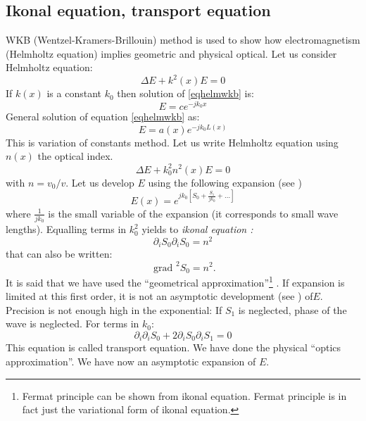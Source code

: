 \documentclass[12pt]{book}
\begin{document}
\subsection{Ikonal equation, transport equation}\label{secWKB}
WKB (Wentzel-Kramers-Brillouin) method
is used to show how electromagnetism (Helmholtz equation) implies geometric
and physical optical.
Let us consider Helmholtz equation:
\begin{equation}\label{eqhelmwkb}
\Delta E+k^2(x)E=0
\end{equation}
If $k(x)$ is a constant $k_0$ then solution of \ref{eqhelmwkb} is:
\begin{equation}
E=ce^{-jk_0x}
\end{equation}
General solution of equation \ref{eqhelmwkb} as:
\begin{equation}
E=a(x)e^{-jk_0L(x)}
\end{equation}
This is variation of constants method. Let us write Helmholtz
equation  using $n(x)$ the optical 
index. 
\begin{equation}
\Delta E+k_0^2n^2(x)E=0
\end{equation}
with $n=v_0/v$.
Let us develop $E$ using the following expansion (see \cite{ma:equad:Bender87})
\begin{equation}
E(x)=e^{jk_0[S_0+\frac{S_1}{jk_0}+\dots]}
\end{equation}
where $\frac{1}{jk_0}$ is the small variable of the expansion (it corresponds
to small wave lengths).
Equalling terms in $k_0^2$ yields to {\it ikonal equation
:}
\begin{equation}
\partial_iS_0\partial_iS_0=n^2
\end{equation}
that can also be written:
\begin{equation}
\mbox{ grad }^2S_0=n^2.
\end{equation}
It is said that we have used the ``geometrical approximation''\footnote{%
Fermat principle can be shown from ikonal equation. Fermat principle is in
fact just the variational form of ikonal equation.
}%
. If expansion is limited at this first order, it is not an asymptotic
development  (see \cite{ma:equad:Bender87}) of$E$. Precision is not enough
high in the exponential: If $S_1$ is neglected, phase of the wave is
neglected. For terms in $k_0$:
\begin{equation}
\partial_i\partial_iS_0+2\partial_iS_0\partial_iS_1=0
\end{equation}
This equation is called transport equation. We
have done the physical ``optics approximation''. We have now an asymptotic
expansion of $E$.
\end{document}
